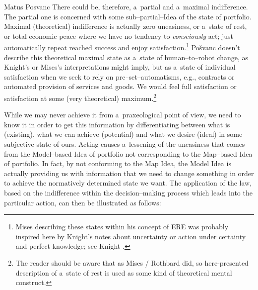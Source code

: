 \begin{artengenv}{Matus Posvanc}
There could be, therefore, a~partial and a~maximal indifference. The partial one is concerned with some sub–partial–Idea of the state of portfolio. Maximal (theoretical) indifference is actually zero uneasiness, or a~state of rest, or total economic peace 
\parencite[as described by][]{Mises1998Human} %
 where we have no tendency to \textit{consciously} act; just automatically repeat reached success and enjoy satisfaction.\footnote{Mises describing these states within his concept of ERE was probably inspired here by Knight's notes about uncertainty or action under certainty and perfect knowledge; see Knight 
\parencites*[][]{Knight1964Risk}[][pp.201, 268, 294]{Knight1964Risk}.%
} Pošvanc 
\parencite[][pp.203–211]{Posvanc2021Evolutionary} %
 doesn't describe this theoretical maximal state as a~state of human–to–robot change, as Knight's or Mises's interpretations might imply, but as a~state of individual satisfaction when we seek to rely on pre–set–automatisms, e.g., contracts or automated provision of services and goods. We would feel full satisfaction or satisfaction at some (very theoretical) maximum.\footnote{The reader should be aware that as Mises / Rothbard did, so here-presented description of a~state of rest is used as some kind of theoretical mental construct.}



While we may never achieve it from a~praxeological point of view, we need to know it in order to get this information by differentiating between what is (existing), what we can achieve (potential) and what we desire (ideal) in some subjective state of ours. Acting causes a~lessening of the uneasiness that comes from the Model–based Idea of portfolio not corresponding to the Map–based Idea of portfolio. In fact, by not conforming to the Map Idea, the Model Idea is actually providing us with information that we need to change something in order to achieve the normatively determined state we want. The application of the law, based on the indifference within the decision–making process which leads into the particular action, can then be illustrated as follows:



\end{artengenv}
